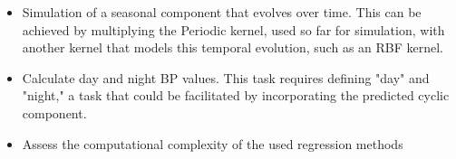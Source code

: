 \begin{itemize}
    \item Simulation of a seasonal component that evolves over time.
    This can be achieved by multiplying the Periodic kernel, used so far for simulation,
    with another kernel that models this temporal evolution, such as an RBF kernel.

    \item Calculate day and night BP values. This task requires defining "day" and "night," a task that could be
    facilitated by incorporating the predicted cyclic component.

    \item Assess the computational complexity of the used regression methods

\end{itemize}







%
%
%
%

